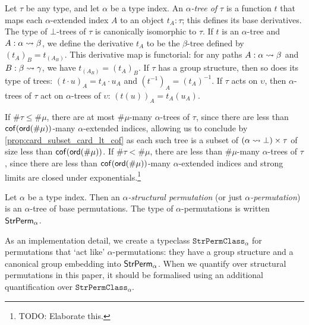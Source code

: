 \begin{definition}[tree]
  \label{def:Tree}
  Let \( \tau \) be any type, and let \( \alpha \) be a type index.
  An \emph{\( \alpha \)-tree of \( \tau \)} is a function \( t \) that maps each \( \alpha \)-extended index \( A \) to an object \( t_A : \tau \); this defines its base derivatives.
  The type of \( \bot \)-trees of \( \tau \) is canonically isomorphic to \( \tau \).
  If \( t \) is an \( \alpha \)-tree and \( A : \alpha \rightsquigarrow \beta \), we define the derivative \( t_A \) to be the \( \beta \)-tree defined by \( (t_A)_B = t_{(A_B)} \).
  This derivative map is functorial: for any paths \( A : \alpha \rightsquigarrow \beta \) and \( B : \beta \rightsquigarrow \gamma \), we have \( t_{(A_B)} = (t_A)_B \).
  If \( \tau \) has a group structure, then so does its type of trees: \( (t \cdot u)_A = t_A \cdot u_A \) and \( (t^{-1})_A = (t_A)^{-1} \).
  If \( \tau \) acts on \( \upsilon \), then \( \alpha \)-trees of \( \tau \) act on \( \alpha \)-trees of \( \upsilon \): \( (t(u))_A = t_A(u_A) \).

  If \( \#\tau \leq \#\mu \), there are at most \( \#\mu \)-many \( \alpha \)-trees of \( \tau \), since there are less than \( \operatorname{\mathsf{cof}}(\operatorname{\mathsf{ord}}(\#\mu)) \)-many \( \alpha \)-extended indices, allowing us to conclude by \cref{prop:card_subset_card_lt_cof} as each such tree is a subset of \( (\alpha \rightsquigarrow \bot) \times \tau \) of size less than \( \operatorname{\mathsf{cof}}(\operatorname{\mathsf{ord}}(\#\mu)) \).
  If \( \#\tau < \#\mu \), there are less than \( \#\mu \)-many \( \alpha \)-trees of \( \tau \), since there are less than \( \operatorname{\mathsf{cof}}(\operatorname{\mathsf{ord}}(\#\mu)) \)-many \( \alpha \)-extended indices and strong limits are closed under exponentials.\footnote{TODO: Elaborate this.}
\end{definition}
\begin{definition}
  \label{def:StrPerm}
  Let \( \alpha \) be a type index.
  Then an \emph{\( \alpha \)-structural permutation} (or just \emph{\( \alpha \)-permutation}) is an \( \alpha \)-tree of base permutations.
  The type of \( \alpha \)-permutations is written \( \mathsf{StrPerm}_\alpha \).
\end{definition}
As an implementation detail, we create a typeclass \( \texttt{StrPermClass}_\alpha \) for permutations that `act like' \( \alpha \)-permutations: they have a group structure and a canonical group embedding into \( \mathsf{StrPerm}_\alpha \).
When we quantify over structural permutations in this paper, it should be formalised using an additional quantification over \( \texttt{StrPermClass}_\alpha \).
